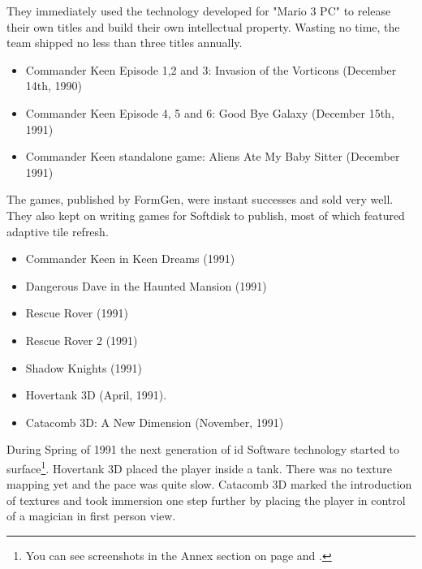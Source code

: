 \documentclass[book.tex]{subfiles}
\begin{document}
They immediately used the technology developed for "Mario 3 PC" to release their own titles and build their own intellectual property. Wasting no time, the team shipped no less than three titles annually.
\begin{itemize}
    \item Commander Keen Episode 1,2 and 3: Invasion of the Vorticons (December 14th, 1990)
    \item Commander Keen Episode 4, 5 and 6: Good Bye Galaxy (December 15th, 1991)
    \item Commander Keen standalone game: Aliens Ate My Baby Sitter (December 1991)
\end{itemize}
The games, published by FormGen, were instant successes and sold very well. They also kept on writing games for Softdisk to publish, most of which featured adaptive tile refresh.
\begin{itemize}
  \item Commander Keen in Keen Dreams (1991)
  \item Dangerous Dave in the Haunted Mansion (1991)
  \item Rescue Rover (1991)
  \item Rescue Rover 2 (1991)
  \item Shadow Knights (1991)
  \item Hovertank 3D (April, 1991).
  \item Catacomb 3D: A New Dimension (November, 1991)
\end{itemize}
During Spring of 1991 the next generation of id Software technology started to surface\footnote{You can see screenshots in the Annex section on page \pageref{hovertank3d_screenshot} and \pageref{catacomb3d_screenshot}.}. Hovertank 3D placed the player inside a tank. There was no texture mapping yet and the pace was quite slow. Catacomb 3D marked the introduction of textures and took immersion one step further by placing the player in control of a magician in first person view. \\
\par
\end{document}
